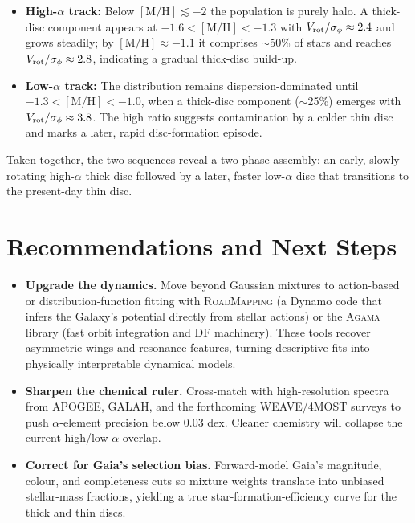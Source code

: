 \documentclass[a4paper,10pt]{article}
\begin{document}
\begin{multicols}{2}
\begin{itemize}
  \item \textbf{High-$\alpha$ track:} Below $\mathrm{[M/H]}\lesssim -2$ the population is purely halo.  
        A thick-disc component appears at $-1.6 < [\mathrm{M/H}] < -1.3$ with 
        $V_{\rm rot}/\sigma_\phi \approx 2.4$ and grows steadily; by 
        $[\mathrm{M/H}]\approx -1.1$ it comprises $\sim$50\% of stars and 
        reaches $V_{\rm rot}/\sigma_\phi \approx 2.8$, indicating a gradual 
        thick-disc build-up.
  \item \textbf{Low-$\alpha$ track:} The distribution remains dispersion-dominated 
        until $-1.3 < [\mathrm{M/H}] < -1.0$, when a thick-disc component 
        ($\sim$25\%) emerges with $V_{\rm rot}/\sigma_\phi \approx 3.8$.  
        The high ratio suggests contamination by a colder thin disc and marks a 
        later, rapid disc-formation episode.
\end{itemize}

Taken together, the two sequences reveal a two-phase assembly: an early, 
slowly rotating high-$\alpha$ thick disc followed by a later, faster low-$\alpha$ 
disc that transitions to the present-day thin disc.


\section*{Recommendations and Next Steps}

\begin{itemize}
  \item \textbf{Upgrade the dynamics.}  Move beyond Gaussian mixtures to
        action-based or distribution-function fitting with
        \textsc{RoadMapping} (a Dynamo code that infers the Galaxy's potential
        directly from stellar actions) or the \textsc{Agama} library
        (fast orbit integration and DF machinery).  These tools recover
        asymmetric wings and resonance features, turning descriptive fits into
        physically interpretable dynamical models.

  \item \textbf{Sharpen the chemical ruler.}  Cross-match with high-resolution
        spectra from APOGEE, GALAH, and the forthcoming WEAVE/4MOST surveys to
        push $\alpha$-element precision below 0.03 dex.  Cleaner chemistry will
        collapse the current high/low-$\alpha$ overlap.

  \item \textbf{Correct for Gaia’s selection bias.}  Forward-model Gaia's
        magnitude, colour, and completeness cuts so mixture weights translate
        into unbiased stellar-mass fractions, yielding a true
        star-formation-efficiency curve for the thick and thin discs.


\end{itemize}
\end{multicols}
\end{document}
